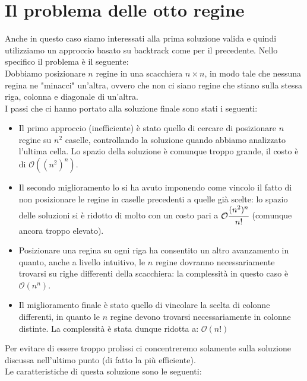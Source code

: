 \documentclass[../cheatSheetAlgoritmi.tex]{subfiles}
\begin{document}
\section{Il problema delle otto regine}
Anche in questo caso siamo interessati alla prima soluzione valida e quindi utilizziamo un approccio basato su backtrack come per il precedente. 
Nello specifico il problema è il seguente: \\
Dobbiamo posizionare $n$ regine in una scacchiera $n \times n$, in modo tale che nessuna regina ne "minacci" un'altra, ovvero che non ci siano regine che stiano sulla stessa riga, colonna e diagonale di un'altra.\\
I passi che ci hanno portato alla soluzione finale sono stati i seguenti:
\begin{itemize}
	\item Il primo approccio (inefficiente) è stato quello di cercare di posizionare $n$ regine su $n^2$ caselle, controllando la soluzione quando abbiamo analizzato l'ultima cella. Lo spazio della soluzione è comunque troppo grande, il costo è di $\mathcal{O}((n^2)^n)$.
	\item Il secondo miglioramento lo si ha avuto imponendo come vincolo il fatto di non posizionare le regine in caselle precedenti a quelle già scelte: lo spazio delle soluzioni si è ridotto di molto con un costo pari a  $\mathcal{O}\cfrac{(n^2)^n}{n!}$ (comunque ancora troppo elevato).
	\item Posizionare una regina su ogni riga ha consentito un altro avanzamento in quanto, anche a livello intuitivo, le $n$ regine dovranno necessariamente trovarsi su righe differenti della scacchiera: la complessità in questo caso è $\mathcal{O}(n^n)$.
	\item Il miglioramento finale è stato quello di vincolare la scelta di colonne differenti, in quanto le $n$ regine devono trovarsi necessariamente in colonne distinte. La complessità è stata dunque ridotta a: $\mathcal{O}(n!)$
\end{itemize}
Per evitare di essere troppo prolissi ci concentreremo solamente sulla soluzione discussa nell'ultimo punto (di fatto la più efficiente). \\
Le caratteristiche di questa soluzione sono le seguenti: 
\end{document}
